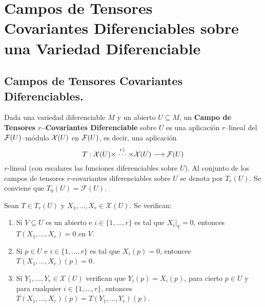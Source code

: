 \documentclass[cursovd_portada.tex]{subfiles}
\begin{document}
\chapter{Campos de Tensores\\ Covariantes Diferenciables sobre una Va\-rie\-dad Diferenciable}
\section{Campos de Tensores Covariantes Diferenciables.}
\begin{defi}
Dada una variedad diferenciable $M$ y un abierto $U\subseteq M$, un {\bf Campo de Tensores $r$--Covariantes
Diferenciable} sobre $U$ es una aplicaci\'{o}n $r$--lineal del ${\cal F}(U)$--m\'{o}dulo ${\cal X}(U)$ en ${\cal F}(U)$, es
decir, una aplicaci\'{o}n
$$T:{\cal X}(U)\times\stackrel{r)}\cdots\times\mathcal{X}(U)\longrightarrow\mathcal{F}(U)$$
$r$-lineal (con escalares las funciones diferenciables sobre $U$). Al conjunto de los campos de tensores
$r$-covariantes diferenciables sobre $U$ se denota por $T_r(U)$. Se conviene que $T_0(U)=\mathcal{F}(U)$.
\end{defi}
\begin{prop}
Sean $T\in T_r(U)$ y $X_1,\dots ,X_r\in\mathcal{X}(U)$. Se verifican:
\begin{enumerate}
\item Si $V\subseteq U$ es un abierto e $i\in\{1,\dots ,r\}$ es tal que $X_i|_V=0$, entonces $T(X_1,\dots ,X_r)=0$
en $V$.
\item Si $p\in U$ e $i\in\{1,\dots ,r\}$ es tal que $X_i(p)=0$, entonces $T(X_1,\dots ,X_r)(p)=0$.
\item Si $Y_1,\dots ,Y_r\in\mathcal{X}(U)$ verifican que $Y_i(p)=X_i(p)$, para cierto $p\in U$ y para cualquier
$i\in\{1,\dots ,r\}$, entonces $T(X_1,\dots ,X_r)(p)=T(Y_1,\dots ,Y_r)(p)$.
\end{enumerate}
\end{prop}
\end{document}
